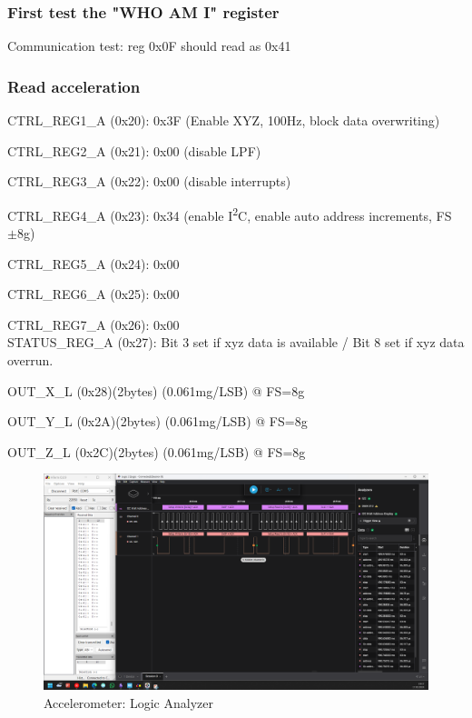 \subsubsection{First test the "WHO AM I" register}
Communication test: reg 0x0F should read as 0x41

\subsubsection{Read acceleration}
CTRL\_REG1\_A (0x20): 0x3F (Enable XYZ, 100Hz, block data overwriting)

CTRL\_REG2\_A (0x21): 0x00 (disable LPF)

CTRL\_REG3\_A (0x22): 0x00 (disable interrupts)

CTRL\_REG4\_A (0x23): 0x34 (enable I\textsuperscript{2}C, enable auto address increments, FS $\pm$8g)

CTRL\_REG5\_A (0x24): 0x00

CTRL\_REG6\_A (0x25): 0x00

CTRL\_REG7\_A (0x26): 0x00
\\

STATUS\_REG\_A (0x27):
Bit 3 set if xyz data is available / Bit 8 set if xyz data overrun.

OUT\_X\_L (0x28)(2bytes)   (0.061mg/LSB) @ FS=8g

OUT\_Y\_L (0x2A)(2bytes)   (0.061mg/LSB) @ FS=8g

OUT\_Z\_L (0x2C)(2bytes)   (0.061mg/LSB) @ FS=8g

\begin{figure}[H]
	\centering
	\includegraphics[width=17cm]{Resources/accTestLA.png}
	\caption{Accelerometer: Logic Analyzer}
	\label{fig:accTestLA}
\end{figure}